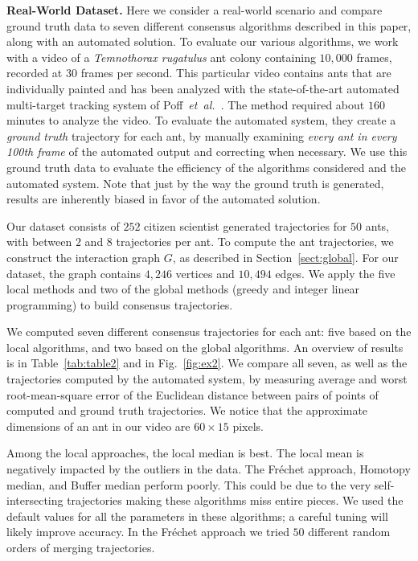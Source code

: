 \documentclass[runningheads]{llncs}
\newcommand{\Frechet}[0]{Fr\'{e}chet}
\begin{document}
{\bf Real-World Dataset.}
Here we consider a real-world scenario and compare ground truth data
to seven different consensus algorithms described in this paper, along
with an automated solution.
To evaluate our various algorithms, we work with a video of a {\em
Temnothorax rugatulus} ant colony containing $10,000$ frames, recorded
at $30$ frames per second.
This particular video contains ants that are individually painted and
has been analyzed with the state-of-the-art automated multi-target tracking system of
Poff~{\em et~al.}~\cite{Poff12}. The method required about $160$ minutes to analyze
the video.
To evaluate the automated system,
they create a {\em ground truth} trajectory for each ant, by manually
examining \emph{every ant in every 100th frame} of the automated
output and correcting when necessary.
We use this ground truth data to evaluate the efficiency of the algorithms considered
and the automated system. Note that just by the
way the ground truth is generated, results are
inherently biased in favor of the automated solution.

Our dataset consists of $252$ citizen scientist generated
trajectories for $50$ ants, with between $2$ and $8$ trajectories per ant.
To compute the ant trajectories, we construct the interaction graph
$G$, as described in Section~\ref{sect:global}. For our dataset, the
graph contains $4,246$ vertices and $10,494$ edges.
We apply the five local methods and two of the global methods
(greedy and integer linear programming) to build consensus
trajectories.


We computed seven different consensus trajectories for each ant: five based on the local
algorithms, and two based on the global algorithms. An overview of
results is in Table~\ref{tab:table2} and in Fig.~\ref{fig:ex2}. We
compare all seven, as well as the trajectories computed by the
automated system, by measuring average and worst root-mean-square
error of the Euclidean distance between pairs of points of
computed  and ground truth trajectories. We notice that the approximate dimensions of an
ant in our video are $60\times 15$ pixels.


Among the local approaches, the local
median is best. The local mean is negatively impacted by the outliers in the data.
The \Frechet{} approach, Homotopy median, and Buffer median perform poorly.
This could be due to the very self-intersecting trajectories making these algorithms
miss entire pieces. We used the default values for all the parameters in
these algorithms; a careful tuning will likely improve accuracy.
In the \Frechet{} approach we tried $50$  different random orders of merging trajectories.
\end{document}
